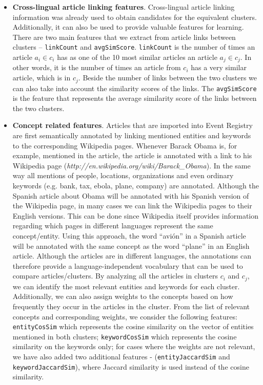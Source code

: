 \documentclass[twoside,11pt]{article}
\begin{document}
\begin{itemize}
\item {\bf Cross-lingual article linking features}. Cross-lingual article linking information was already used to obtain candidates for the equivalent clusters. Additionally, it can also be used to provide valuable  features for learning. There are two main features that we extract from article links between clusters -- \texttt{linkCount} and \texttt{avgSimScore}. \texttt{linkCount} is the number of times an article $a_i \in c_i$ has as one of the 10 most similar articles an article $a_j \in c_j$. In other words, it is the number of times an article from $c_i$ has a very similar article, which is in $c_j$. Beside the number of links between the two clusters we can also take into account the similarity scores of the links. The \texttt{avgSimScore} is the feature that represents the average similarity score of the links between the two clusters.

\item {\bf Concept related features}. Articles that are imported into Event Registry are first semantically annotated by linking mentioned entities and keywords to the corresponding Wikipedia pages. Whenever Barack Obama is, for example, mentioned in the article, the article is annotated with a link to his Wikipedia page (\emph{http://en.wikipedia.org/wiki/Barack\_Obama}). In the same way all mentions of people, locations, organizations and even ordinary keywords (e.g. bank, tax, ebola, plane, company) are annotated. Although the Spanish article about Obama will be annotated with his Spanish version of the Wikipedia page, in many cases we can link the Wikipedia pages to their English versions. This can be done since Wikipedia itself provides information regarding which pages in different languages represent the same concept/entity. Using this approach, the word ``avi\'on'' in a Spanish article will be annotated with the same concept as the word ``plane'' in an English article. Although the articles are in different languages, the annotations can therefore provide a language-independent vocabulary that can be used to compare articles/clusters. By analyzing all the articles in clusters $c_i$ and $c_j$, we can identify the most relevant entities and keywords for each cluster. Additionally, we can also assign weights to the concepts based on how frequently they occur in the articles in the cluster. From the list of relevant concepts and corresponding weights, we consider the following features: \texttt{entityCosSim} which represents the cosine similarity on the vector of entities mentioned in both clusters; \texttt{keywordCosSim} which represents the cosine similarity on the keywords only; for cases where the weights are not relevant, we have also added two additional features - (\texttt{entityJaccardSim} and \texttt{keywordJaccardSim}), where Jaccard similarity is used instead of the cosine similarity.


\end{itemize}
\end{document}
